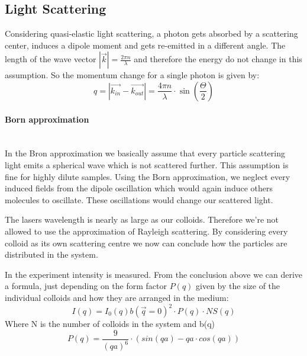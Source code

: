 \documentclass[]{article}
\begin{document}
\subsection{Light Scattering}
Considering quasi-elastic light scattering, a photon gets absorbed by a scattering center, induces a dipole moment and gets re-emitted in a different angle. The length of the wave vector $ |\vec{k}| = \frac{2\pi n}{\lambda}$ and therefore the energy do not change in this assumption. So the momentum change for a single photon is given by:
\begin{equation}\label{eq:momentum}
q= |\vec{k_{in}} - \vec{k_{out}}| = \frac{4\pi n}{\lambda} \cdot \sin \left( \dfrac{\Theta}{2} \right)  
\end{equation}

\paragraph{Born approximation}\mbox{}\\
In the Bron approximation we basically assume that every particle scattering light emits a spherical wave which is not scattered further. This assumption is fine for highly dilute samples.
Using the Born approximation, we neglect every induced fields from the dipole oscillation which would again induce others molecules to oscillate. These oscillations would change our scattered light.%

The lasers wavelength is nearly as large as our colloids. Therefore we're not allowed to use the approximation of Rayleigh scattering. By considering every colloid as its own scattering centre we now can conclude how the particles are distributed in the system.

In the experiment intensity is measured. From the conclusion above we can derive a formula, just depending on the form factor $P(q)$ given by the size of the individual colloids and how they are arranged in the medium:
\begin{equation} \label{eq:intensity}
I(q) = I_0(q)b(\vec{q}=0)^2 \cdot P(q) \cdot NS(q)
\end{equation}
Where N is the number of colloids in the system and b(q) 
\\

\begin{equation}\label{eq:form}
P(q)= \frac{9}{(qa)^6} \cdot (sin(qa) - qa \cdot cos(qa))
\end{equation}
\end{document}
